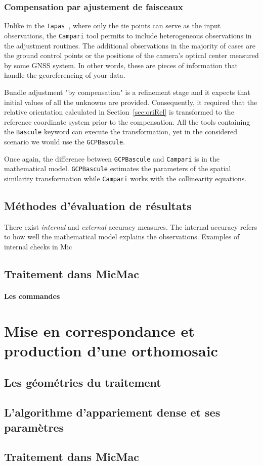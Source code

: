 \documentclass[11pt,a4paper,oneside]{book}
\begin{document}
\subsection{Compensation par ajustement de faisceaux}\label{subsec:compensation}
%
Unlike in the {\tt Tapas }, where only the tie points can serve as the input observations, the {\tt Campari} tool permits to include heterogeneous observations in the adjustment routines. The additional observations in the majority of cases are the ground control points or the positions of the camera's optical center measured by some GNSS system. In other words, these are pieces of information that handle the georeferencing of your data.\par 
%
Bundle adjustment "by compensation" is a refinement stage and it expects that initial values of all the unknowns are provided. Consequently, it required that the relative orientation calculated in Section~\ref{sec:oriRel} is transformed to the reference coordinate system prior to the compensation. All the tools containing the {\tt Bascule} keyword can execute the transformation, yet in the considered scenario we would use the {\tt GCPBascule}.\par 
%
Once again, the difference between {\tt GCPBascule} and {\tt Campari} is in the mathematical model. {\tt GCPBascule} estimates the parameters of the spatial similarity transformation while {\tt Campari} works with the collinearity equations.

%
\section{Méthodes d’évaluation de résultats}
%
There exist \textit{internal} and \textit{external} accuracy measures. The internal accuracy refers to how well the mathematical model explains the observations. Examples of internal checks in Mic 

 

%
\section{Traitement dans MicMac}



\subsubsection{Les commandes}

\chapter{Mise en correspondance et production d'une orthomosaic}

\section{Les géométries du traitement}
\section{L’algorithme d'appariement dense et ses paramètres}
\section{Traitement dans MicMac}
\end{document}
